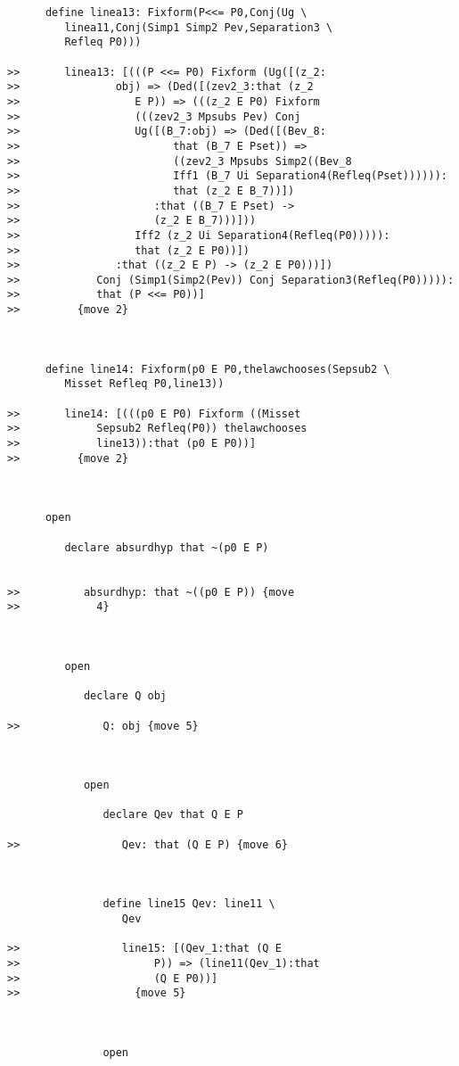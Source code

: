 \documentclass[12pt]{article}
\begin{document}
\begin{verbatim}
      define linea13: Fixform(P<<= P0,Conj(Ug \
         linea11,Conj(Simp1 Simp2 Pev,Separation3 \
         Refleq P0)))

>>       linea13: [(((P <<= P0) Fixform (Ug([(z_2:
>>               obj) => (Ded([(zev2_3:that (z_2
>>                  E P)) => (((z_2 E P0) Fixform
>>                  (((zev2_3 Mpsubs Pev) Conj
>>                  Ug([(B_7:obj) => (Ded([(Bev_8:
>>                        that (B_7 E Pset)) =>
>>                        ((zev2_3 Mpsubs Simp2((Bev_8
>>                        Iff1 (B_7 Ui Separation4(Refleq(Pset)))))):
>>                        that (z_2 E B_7))])
>>                     :that ((B_7 E Pset) ->
>>                     (z_2 E B_7)))]))
>>                  Iff2 (z_2 Ui Separation4(Refleq(P0))))):
>>                  that (z_2 E P0))])
>>               :that ((z_2 E P) -> (z_2 E P0)))])
>>            Conj (Simp1(Simp2(Pev)) Conj Separation3(Refleq(P0))))):
>>            that (P <<= P0))]
>>         {move 2}



      define line14: Fixform(p0 E P0,thelawchooses(Sepsub2 \
         Misset Refleq P0,line13))

>>       line14: [(((p0 E P0) Fixform ((Misset
>>            Sepsub2 Refleq(P0)) thelawchooses
>>            line13)):that (p0 E P0))]
>>         {move 2}



      open

         declare absurdhyp that ~(p0 E P)


>>          absurdhyp: that ~((p0 E P)) {move
>>            4}



         open

            declare Q obj

>>             Q: obj {move 5}



            open

               declare Qev that Q E P

>>                Qev: that (Q E P) {move 6}



               define line15 Qev: line11 \
                  Qev

>>                line15: [(Qev_1:that (Q E
>>                     P)) => (line11(Qev_1):that
>>                     (Q E P0))]
>>                  {move 5}



               open


\end{verbatim}
\end{document}
